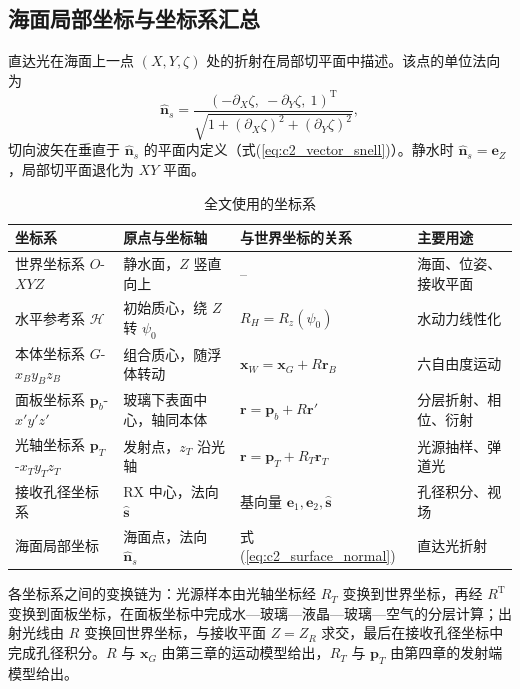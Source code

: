 \subsection{海面局部坐标与坐标系汇总}

直达光在海面上一点 $(X,Y,\zeta)$ 处的折射在局部切平面中描述。该点的单位法向为
\begin{equation}
\hat{\mathbf n}_s=\frac{(-\partial_X\zeta,\ -\partial_Y\zeta,\ 1)^{\mathrm T}}{\sqrt{1+(\partial_X\zeta)^2+(\partial_Y\zeta)^2}},
\label{eq:c2_surface_normal}
\end{equation}
切向波矢在垂直于 $\hat{\mathbf n}_s$ 的平面内定义（式(\ref{eq:c2_vector_snell})）。静水时 $\hat{\mathbf n}_s=\mathbf e_Z$，局部切平面退化为 $XY$ 平面。

\begin{table}[htbp]
\caption{全文使用的坐标系}
\label{tab:c2_frames}
\centering
\small
\begin{tabular}{llll}
\toprule
坐标系 & 原点与坐标轴 & 与世界坐标的关系 & 主要用途 \\
\midrule
世界坐标系 $O$-$XYZ$ & 静水面，$Z$ 竖直向上 & -- & 海面、位姿、接收平面 \\
水平参考系 $\mathcal H$ & 初始质心，绕 $Z$ 转 $\psi_0$ & $R_H=R_z(\psi_0)$ & 水动力线性化 \\
本体坐标系 $G$-$x_By_Bz_B$ & 组合质心，随浮体转动 & $\mathbf x_W=\mathbf x_G+R\mathbf r_B$ & 六自由度运动 \\
面板坐标系 $\mathbf p_b$-$x'y'z'$ & 玻璃下表面中心，轴同本体 & $\mathbf r=\mathbf p_b+R\mathbf r'$ & 分层折射、相位、衍射 \\
光轴坐标系 $\mathbf p_T$-$x_Ty_Tz_T$ & 发射点，$z_T$ 沿光轴 & $\mathbf r=\mathbf p_T+R_T\mathbf r_T$ & 光源抽样、弹道光 \\
接收孔径坐标系 & RX 中心，法向 $\hat{\mathbf s}$ & 基向量 $\mathbf e_1,\mathbf e_2,\hat{\mathbf s}$ & 孔径积分、视场 \\
海面局部坐标 & 海面点，法向 $\hat{\mathbf n}_s$ & 式(\ref{eq:c2_surface_normal}) & 直达光折射 \\
\bottomrule
\end{tabular}
\end{table}

各坐标系之间的变换链为：光源样本由光轴坐标经 $R_T$ 变换到世界坐标，再经 $R^{\mathrm T}$ 变换到面板坐标，在面板坐标中完成水—玻璃—液晶—玻璃—空气的分层计算；出射光线由 $R$ 变换回世界坐标，与接收平面 $Z=Z_R$ 求交，最后在接收孔径坐标中完成孔径积分。$R$ 与 $\mathbf x_G$ 由第三章的运动模型给出，$R_T$ 与 $\mathbf p_T$ 由第四章的发射端模型给出。

